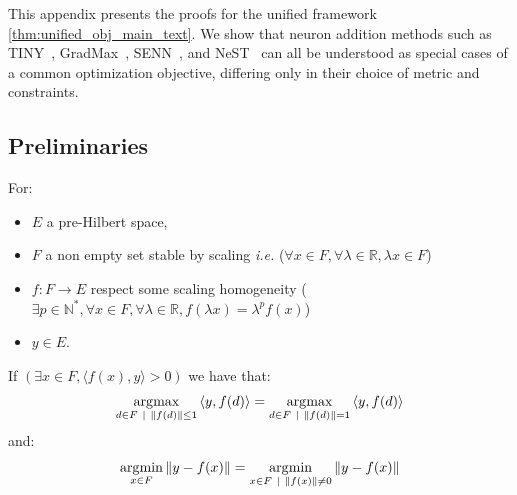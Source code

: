 
This appendix presents the proofs for the unified framework \autoref{thm:unified_obj_main_text}. We show that neuron addition methods
such as TINY~\citep{verbockhaven_growing_2024}, GradMax~\citep{evci_gradmax_2022}, SENN~\citep{mitchell_self-expanding_2024}, and NeST~\citep{daiNeSTNeuralNetwork2019} can all be understood as special
cases of a common optimization objective, differing only in their choice
of metric and constraints.

\subsection{Preliminaries}

\begin{lemma}\label{lemma:argument_scaling}

For:

\begin{itemize}
\item \(E\) a pre-Hilbert space,
\item \(F\) a non empty set stable by scaling \emph{i.e.}
  (\(\forall x \in F,\forall\lambda \in \mathbb{R},\lambda x \in F\))
\item \(f:F \rightarrow E\) respect some scaling homogeneity
  (\(\exists p \in \mathbb{N}^{\ast},\forall x \in F,\forall\lambda \in \mathbb{R},f(\lambda x) = \lambda^{p}f(x)\))
\item \(y \in E\).
\end{itemize}
If \(\left( \exists x \in F,{\langle f(x),y\rangle} > 0 \right)\) we
have that:
\[\operatorname*{\arg\!\max}_{d \in F~|~\left\| {f(d)} \right\| \leq 1}{\langle y,f(d)\rangle} = \operatorname*{\arg\!\max}_{d \in F~|~\left\| {f(d)} \right\| = 1}{\langle y,f(d)\rangle}\]
and:
\[\operatorname*{\arg\!\min}_{x \in F}\left\| {y - f(x)} \right\| = \operatorname*{\arg\!\min}_{x \in F~|~\left\| {f(x)} \right\| \neq 0}\left\| {y - f(x)} \right\|\]

\end{lemma}

